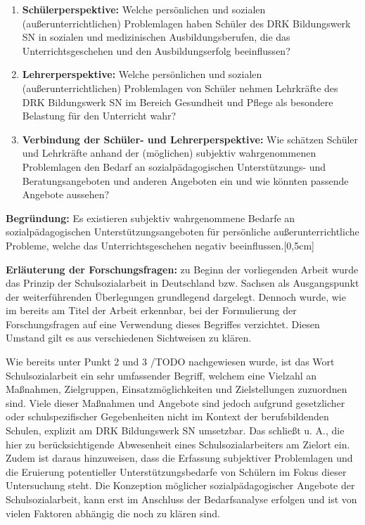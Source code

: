 \begin{enumerate}
	\item \textbf{Schülerperspektive:}
	Welche persönlichen und sozialen (außerunterrichtlichen) Problemlagen haben Schüler des DRK Bildungswerk SN in sozialen und medizinischen Ausbildungsberufen, die das Unterrichtsgeschehen und den Ausbildungserfolg beeinflussen?
	\item \textbf{Lehrerperspektive:}
	Welche persönlichen und sozialen (außerunterrichtlichen) Problemlagen von Schüler nehmen Lehrkräfte des DRK Bildungswerk SN im Bereich Gesundheit und Pflege als besondere Belastung für den Unterricht wahr?
	\item \textbf{Verbindung der Schüler- und Lehrerperspektive:}
	Wie schätzen Schüler und Lehrkräfte anhand der (möglichen) subjektiv wahrgenommenen Problemlagen den Bedarf an sozialpädagogischen Unterstützungs- und Beratungsangeboten und anderen Angeboten ein und wie könnten passende Angebote aussehen?
\end{enumerate}

\textbf{Begründung:} Es existieren subjektiv wahrgenommene Bedarfe an sozialpädagogischen Unterstützungsangeboten für persönliche außerunterrichtliche Probleme, welche das Unterrichtsgeschehen negativ beeinflussen.[0,5cm]

\textbf{Erläuterung der Forschungsfragen:} zu Beginn der vorliegenden Arbeit wurde das Prinzip der Schulsozialarbeit in Deutschland bzw. Sachsen als Ausgangspunkt der weiterführenden Überlegungen grundlegend dargelegt. Dennoch wurde, wie im bereits am Titel der Arbeit erkennbar, bei der Formulierung der Forschungsfragen auf eine Verwendung dieses Begriffes verzichtet. Diesen Umstand gilt es aus verschiedenen Sichtweisen zu klären.
 
Wie bereits unter Punkt 2 und 3 /TODO nachgewiesen wurde, ist das Wort Schulsozialarbeit ein sehr umfassender Begriff, welchem eine Vielzahl an Maßnahmen, Zielgruppen, Einsatzmöglichkeiten und Zielstellungen zuzuordnen sind. Viele dieser Maßnahmen und Angebote sind jedoch aufgrund gesetzlicher oder schulspezifischer Gegebenheiten nicht im Kontext der berufsbildenden Schulen, explizit am DRK Bildungswerk SN umsetzbar. Das schließt u. A., die hier zu berücksichtigende Abwesenheit eines Schulsozialarbeiters am Zielort ein. Zudem ist daraus hinzuweisen, dass die Erfassung subjektiver Problemlagen und die Eruierung potentieller Unterstützungsbedarfe von Schülern im Fokus dieser Untersuchung steht. Die Konzeption möglicher sozialpädagogischer Angebote der Schulsozialarbeit, kann erst im Anschluss der Bedarfsanalyse erfolgen und ist von vielen Faktoren abhängig die noch zu klären sind.
 
